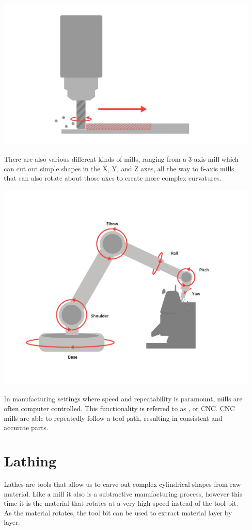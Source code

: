 \includegraphics[width=.75\textwidth]{mill1.png}


There are also various different kinds of mills, ranging from a 3-axis mill which can cut out simple shapes in the X, Y, and Z axes, all the way to 6-axis mills that can also rotate about those axes to create more complex curvatures.

\includegraphics[width=.75\textwidth]{sixAxisCnc.png}


In manufacturing settings where speed and repeatability is paramount, mills are often computer controlled. This functionality is referred to as , or CNC. CNC mills are able to repeatedly follow a tool path, resulting in consistent and accurate parts.

\section{Lathing}

Lathes are tools that allow us to carve out complex cylindrical shapes from raw material. Like a mill it also is a subtractive manufacturing process, however this time it is the material that rotates at a very high speed instead of the tool bit. As the material rotates, the tool bit can be used to extract material layer by layer. 

